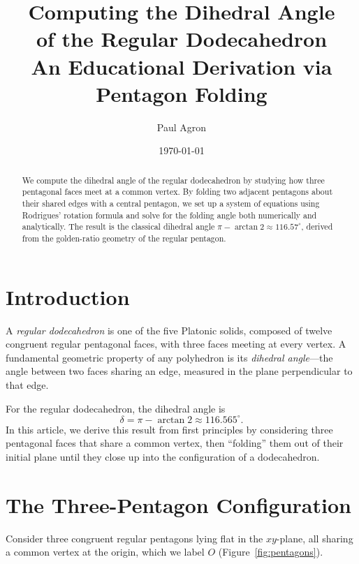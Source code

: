 \documentclass[11pt,a4paper]{article}
\title{\bfseries Computing the Dihedral Angle\\of the Regular Dodecahedron\\[0.3em]
\large An Educational Derivation via Pentagon Folding}
\author{Paul Agron}
\date{\today}
\theoremstyle{definition}
\begin{document}
\maketitle

\begin{abstract}
We compute the dihedral angle of the regular dodecahedron by studying how three
pentagonal faces meet at a common vertex. By folding two adjacent pentagons about
their shared edges with a central pentagon, we set up a system of equations using
Rodrigues' rotation formula and solve for the folding angle both numerically and
analytically. The result is the classical dihedral angle
$\pi - \arctan 2 \approx 116.57^\circ$, derived from the golden-ratio geometry of
the regular pentagon.
\end{abstract}

\tableofcontents
\vspace{1em}

\section{Introduction}

A \emph{regular dodecahedron} is one of the five Platonic solids, composed of twelve
congruent regular pentagonal faces, with three faces meeting at every vertex. A
fundamental geometric property of any polyhedron is its \emph{dihedral angle}---the
angle between two faces sharing an edge, measured in the plane perpendicular to that
edge.

For the regular dodecahedron, the dihedral angle is
\[
  \delta = \pi - \arctan 2 \approx 116.565^\circ.
\]
In this article, we derive this result from first principles by considering three
pentagonal faces that share a common vertex, then ``folding'' them out of their
initial plane until they close up into the configuration of a dodecahedron.

\section{The Three-Pentagon Configuration}

Consider three congruent regular pentagons lying flat in the $xy$-plane, all sharing
a common vertex at the origin, which we label $O$ (Figure~\ref{fig:pentagons}).
\end{document}
